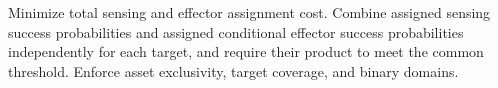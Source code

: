 Minimize total sensing and effector assignment cost. Combine assigned sensing success probabilities and assigned conditional effector success probabilities independently for each target, and require their product to meet the common threshold. Enforce asset exclusivity, target coverage, and binary domains.

